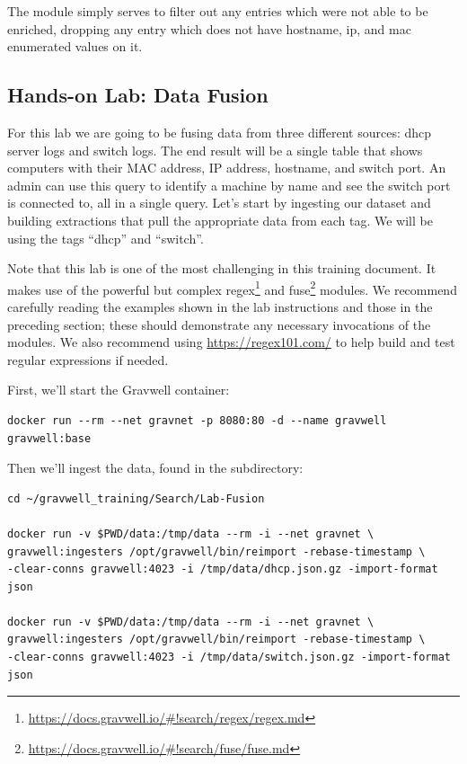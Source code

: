 The  module simply serves to filter out any entries which were not able to be enriched, dropping any entry which does not have hostname, ip, and mac enumerated values on it.

\clearpage
\subsection{Hands-on Lab: Data Fusion}

For this lab we are going to be fusing data from three different
sources: dhcp server logs and switch logs. The end result will be a
single table that shows computers with their MAC address, IP address,
hostname, and switch port. An admin can use this query to identify a
machine by name and see the switch port is connected to, all in a single
query. Let's start by ingesting our dataset and building extractions
that pull the appropriate data from each tag. We will be using the
tags ``dhcp'' and ``switch''.

Note that this lab is one of the most challenging in this training document. It makes use of the powerful but complex regex\footnote{\href{https://docs.gravwell.io/\#!search/regex/regex.md}{https://docs.gravwell.io/\#!search/regex/regex.md}} and fuse\footnote{\href{https://docs.gravwell.io/\#!search/fuse/fuse.md}{https://docs.gravwell.io/\#!search/fuse/fuse.md}} modules. We recommend carefully reading the examples shown in the lab instructions and those in the preceding section; these should demonstrate any necessary invocations of the modules. We also recommend using \href{https://regex101.com/}{https://regex101.com/} to help build and test regular expressions if needed.

First, we'll start the Gravwell container:

\begin{Verbatim}[breaklines=true]
docker run --rm --net gravnet -p 8080:80 -d --name gravwell gravwell:base
\end{Verbatim}

Then we'll ingest the data, found in the  subdirectory:

\begin{Verbatim}[breaklines=true]
cd ~/gravwell_training/Search/Lab-Fusion

docker run -v $PWD/data:/tmp/data --rm -i --net gravnet \
gravwell:ingesters /opt/gravwell/bin/reimport -rebase-timestamp \
-clear-conns gravwell:4023 -i /tmp/data/dhcp.json.gz -import-format json

docker run -v $PWD/data:/tmp/data --rm -i --net gravnet \
gravwell:ingesters /opt/gravwell/bin/reimport -rebase-timestamp \
-clear-conns gravwell:4023 -i /tmp/data/switch.json.gz -import-format json
\end{Verbatim}

